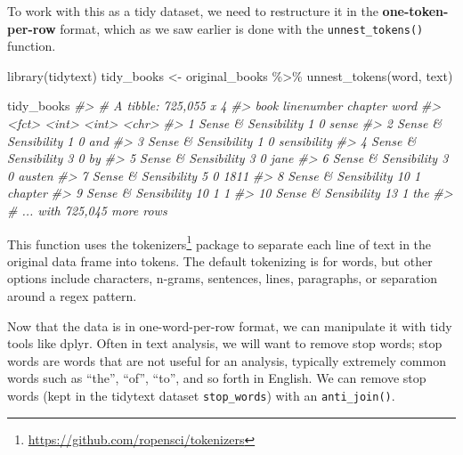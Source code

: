 \documentclass[
]{book}
\newenvironment{Shaded}{\begin{snugshade}}{\end{snugshade}}
\newcommand{\CommentTok}[1]{\textcolor[rgb]{0.56,0.35,0.01}{\textit{#1}}}
\newcommand{\FunctionTok}[1]{\textcolor[rgb]{0.00,0.00,0.00}{#1}}
\newcommand{\NormalTok}[1]{#1}
\newcommand{\OtherTok}[1]{\textcolor[rgb]{0.56,0.35,0.01}{#1}}
\newcommand{\SpecialCharTok}[1]{\textcolor[rgb]{0.00,0.00,0.00}{#1}}
\DeclareRobustCommand{\href}[2]{#2\footnote{\url{#1}}}
\begin{document}
To work with this as a tidy dataset, we need to restructure it in the \textbf{one-token-per-row} format, which as we saw earlier is done with the \texttt{unnest\_tokens()} function.

\begin{Shaded}
\begin{Highlighting}[]
\FunctionTok{library}\NormalTok{(tidytext)}
\NormalTok{tidy\_books }\OtherTok{\textless{}{-}}\NormalTok{ original\_books }\SpecialCharTok{\%\textgreater{}\%}
  \FunctionTok{unnest\_tokens}\NormalTok{(word, text)}

\NormalTok{tidy\_books}
\CommentTok{\#\textgreater{} \# A tibble: 725,055 x 4}
\CommentTok{\#\textgreater{}    book                linenumber chapter word       }
\CommentTok{\#\textgreater{}    \textless{}fct\textgreater{}                    \textless{}int\textgreater{}   \textless{}int\textgreater{} \textless{}chr\textgreater{}      }
\CommentTok{\#\textgreater{}  1 Sense \& Sensibility          1       0 sense      }
\CommentTok{\#\textgreater{}  2 Sense \& Sensibility          1       0 and        }
\CommentTok{\#\textgreater{}  3 Sense \& Sensibility          1       0 sensibility}
\CommentTok{\#\textgreater{}  4 Sense \& Sensibility          3       0 by         }
\CommentTok{\#\textgreater{}  5 Sense \& Sensibility          3       0 jane       }
\CommentTok{\#\textgreater{}  6 Sense \& Sensibility          3       0 austen     }
\CommentTok{\#\textgreater{}  7 Sense \& Sensibility          5       0 1811       }
\CommentTok{\#\textgreater{}  8 Sense \& Sensibility         10       1 chapter    }
\CommentTok{\#\textgreater{}  9 Sense \& Sensibility         10       1 1          }
\CommentTok{\#\textgreater{} 10 Sense \& Sensibility         13       1 the        }
\CommentTok{\#\textgreater{} \# ... with 725,045 more rows}
\end{Highlighting}
\end{Shaded}

This function uses the \href{https://github.com/ropensci/tokenizers}{tokenizers} package to separate each line of text in the original data frame into tokens. The default tokenizing is for words, but other options include characters, n-grams, sentences, lines, paragraphs, or separation around a regex pattern.

Now that the data is in one-word-per-row format, we can manipulate it with tidy tools like dplyr. Often in text analysis, we will want to remove stop words; stop words are words that are not useful for an analysis, typically extremely common words such as ``the'', ``of'', ``to'', and so forth in English. We can remove stop words (kept in the tidytext dataset \texttt{stop\_words}) with an \texttt{anti\_join()}.
\end{document}
